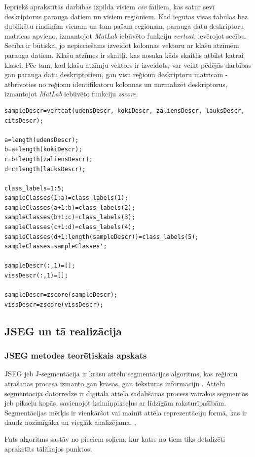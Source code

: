 \documentclass[12pt,paper=a4]{report}
\begin{document}
Iepriekš aprakstītās darbības izpilda visiem \textit{csv} failiem, kas satur sevī deskriptorus parauga datiem un visiem reģioniem. Kad iegūtas visas tabulas bez dublikātu rindiņām vienam un tam pašam reģionam, parauga datu deskriptoru matricas apvieno, izmantojot \textit{MatLab} iebūvēto funkciju \textit{vertcat}, ievērojot secību. Secība ir būtiska, jo nepieciešams izveidot kolonnas vektoru ar klašu atzīmēm parauga datiem. Klašu atzīmes ir skaitļi, kas nosaka kāds skaitlis atbilst katrai klasei. Pēc tam, kad klašu atzīmju vektors ir izveidots, var veikt pēdējās darbības gan parauga datu deskriptoriem, gan visu reģionu deskriptoru matricām - atbrīvoties no reģionu identifikatoru kolonnas un normalizēt deskriptorus, izmantojot \textit{MatLab} iebūvēto funkciju \textit{zscore}.
\begin{lstlisting}
sampleDescr=vertcat(udensDescr, kokiDescr, zaliensDescr, lauksDescr, citsDescr);

a=length(udensDescr);
b=a+length(kokiDescr);
c=b+length(zaliensDescr);
d=c+length(lauksDescr);

class_labels=1:5;
sampleClasses(1:a)=class_labels(1);
sampleClasses(a+1:b)=class_labels(2);
sampleClasses(b+1:c)=class_labels(3);
sampleClasses(c+1:d)=class_labels(4);
sampleClasses(d+1:length(sampleDescr))=class_labels(5);
sampleClasses=sampleClasses';

sampleDescr(:,1)=[];
vissDescr(:,1)=[];

sampleDescr=zscore(sampleDescr);
vissDescr=zscore(vissDescr);
\end{lstlisting}
\subsection{JSEG un tā realizācija}
\subsubsection{JSEG metodes teorētiskais apskats}JSEG jeb J-segmentācija ir krāsu attēlu segmentācijas algoritms, kas reģionu atrašanas procesā izmanto gan krāsas, gan tekstūras informāciju \cite{1colImSegm1999}. Attēlu segmentācija datorredzē ir digitālā attēla sadalīšanas process vairākos segmentos jeb pikseļu kopās, savienojot kaimiņpikseļus ar līdzīgām raksturīpašībām. Segmentācijas mērķis ir vienkāršot vai mainīt attēla reprezentāciju formā, kas ir daudz nozīmīgāka un vieglāk analizējama. \cite{shapiro2001computer}, \cite{cleve2008classification}\par
Pats algoritms sastāv no pieciem soļiem, kur katrs no tiem tiks detalizēti aprakstīts tālākajos punktos.
\end{document}
